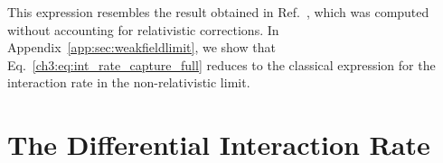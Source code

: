 This expression resembles the result obtained in Ref.~\cite{Garani:2018kkd_may_NewAnalysisNeutron}, which was computed without accounting for relativistic corrections. In Appendix~\ref{app:sec:weakfieldlimit}, we show that Eq.~\ref{ch3:eq:int_rate_capture_full} reduces to the classical expression for the interaction rate in the non-relativistic limit. 


\section{The Differential Interaction Rate}
\label{ch3:sec:diff_int_rate}


